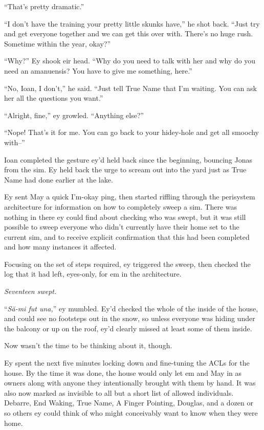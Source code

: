 ``That's pretty dramatic.''

``I don't have the training your pretty little skunks have,'' he shot back. ``Just try and get everyone together and we can get this over with. There's no huge rush. Sometime within the year, okay?''

``Why?'' Ey shook eir head. ``Why do you need to talk with her and why do you need an amanuensis? You have to give me something, here.''

``No, Ioan, I don't,'' he said. ``Just tell True Name that I'm waiting. You can ask her all the questions you want.''

``Alright, fine,'' ey growled. ``Anything else?''

``Nope! That's it for me. You can go back to your hidey-hole and get all smoochy with--''

Ioan completed the gesture ey'd held back since the beginning, bouncing Jonas from the sim. Ey held back the urge to scream out into the yard just as True Name had done earlier at the lake.

Ey sent May a quick I'm-okay ping, then started riffling through the perisystem architecture for information on how to completely sweep a sim. There was nothing in there ey could find about checking who was swept, but it was still possible to sweep everyone who didn't currently have their home set to the current sim, and to receive explicit confirmation that this had been completed and how many instances it affected.

Focusing on the set of steps required, ey triggered the sweep, then checked the log that it had left, eyes-only, for em in the architecture.

\emph{Seventeen swept.}

``\emph{Să-mi fut una,}'' ey mumbled. Ey'd checked the whole of the inside of the house, and could see no footsteps out in the snow, so unless everyone was hiding under the balcony or up on the roof, ey'd clearly missed at least some of them inside.

Now wasn't the time to be thinking about it, though.

Ey spent the next five minutes locking down and fine-tuning the ACLs for the house. By the time it was done, the house would only let em and May in as owners along with anyone they intentionally brought with them by hand. It was also now marked as invisible to all but a short list of allowed individuals. Debarre, End Waking, True Name, A Finger Pointing, Douglas, and a dozen or so others ey could think of who might conceivably want to know when they were home.


